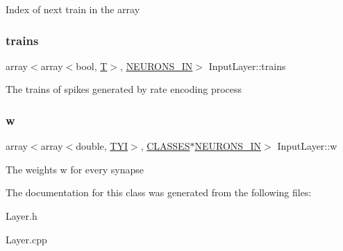 Index of next train in the array \mbox{\label{class_input_layer_abeb3e6442518a3025ed23c048d452055}} 
\subsubsection{\texorpdfstring{trains}{trains}}
{\footnotesize\ttfamily array$<$array$<$bool, \mbox{\hyperlink{_constants_8h_a6108cec236ef7a2e1d3259931de87186}{T}}$>$, \mbox{\hyperlink{_constants_8h_aefc2426e4681da445c7793c98a83c532}{N\+E\+U\+R\+O\+N\+S\+\_\+\+IN}}$>$ Input\+Layer\+::trains\hspace{0.3cm}{\ttfamily [protected]}}

The trains of spikes generated by rate encoding process \mbox{\label{class_input_layer_a89903c767c8ba1ef611feeaa65f9a0d1}} 
\subsubsection{\texorpdfstring{w}{w}}
{\footnotesize\ttfamily array$<$array$<$double, \mbox{\hyperlink{_constants_8h_a45bcfb91788c7d66f5de11604fb1eb6e}{T\+YI}}$>$, \mbox{\hyperlink{_constants_8h_a12148c0e36153a905f4f6ef1afdbb27e}{C\+L\+A\+S\+S\+ES}}$\ast$\mbox{\hyperlink{_constants_8h_aefc2426e4681da445c7793c98a83c532}{N\+E\+U\+R\+O\+N\+S\+\_\+\+IN}}$>$ Input\+Layer\+::w}

The weights w for every synapse 

The documentation for this class was generated from the following files\+:\begin{DoxyCompactItemize}
\item 
Layer.\+h\item 
Layer.\+cpp\end{DoxyCompactItemize}

